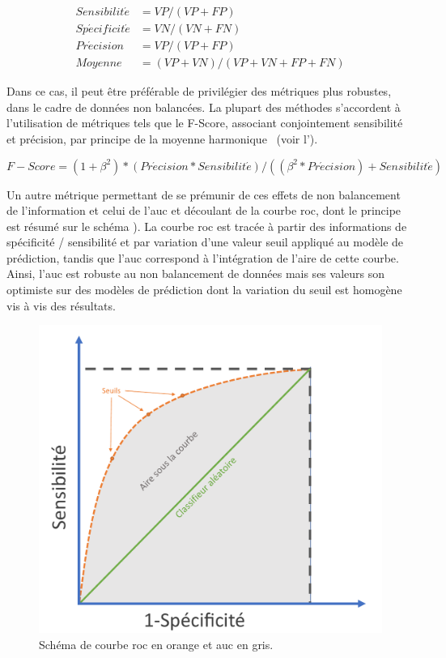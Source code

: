 \begin{equation} 
    \label{eq:metrics_basics}
    \begin{split}
    Sensibilit\acute{e} &= VP/(VP+FP) \\	
    Sp\acute{e}cificit\acute{e} &=  VN/(VN+FN) \\
    Pr\acute{e}cision &= VP/(VP+FP) \\
    Moyenne &= (VP+VN)/(VP+VN+FP+FN)
    \end{split}
\end{equation}

 Dans ce cas, il peut être préférable de privilégier des métriques plus robustes, dans le cadre de données non balancées. La plupart des méthodes s’accordent à l’utilisation de métriques tels que le F-Score, associant conjointement sensibilité et précision, par principe de la moyenne harmonique~\cite{Guo2008} (voir l').\par
 
\begin{equation} 
    {F-Score}=(1+\beta^2)*(Pr\acute{e}cision*Sensibilit\acute{e})/((\beta^2*Pr\acute{e}cision)+Sensibilit\acute{e})
    \label{eq:metrics_fscore}
\end{equation}
 
Un autre métrique permettant de se prémunir de ces effets de non balancement de l'information et celui de l'\gls{auc} et découlant de la courbe \gls{roc}, dont le principe est résumé sur le schéma ). La courbe \gls{roc} est tracée à partir des informations de spécificité / sensibilité et par variation d'une valeur seuil appliqué au modèle de prédiction, tandis que l'\gls{auc} correspond à l'intégration de l'aire de cette courbe. Ainsi, l'\gls{auc} est robuste au non balancement de données mais ses valeurs son optimiste sur des modèles de prédiction dont la variation du seuil est homogène vis à vis des résultats.\par

\begin{figure}[H]
    \centering
    \includegraphics[width=0.6\linewidth]{contents/chapter_3/resources/scheme_roc_curve.pdf}
    \caption{Schéma de courbe \gls{roc} en orange et \gls{auc} en gris.}
    \label{fig:scheme_roc_curve}
\end{figure}

